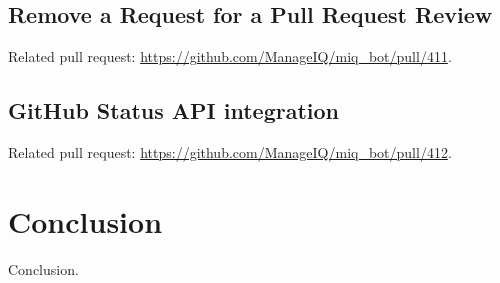 \section{Remove a Request for a Pull Request Review}

Related pull request: \url{https://github.com/ManageIQ/miq_bot/pull/411}.

\section{GitHub Status API integration}

Related pull request: \url{https://github.com/ManageIQ/miq_bot/pull/412}.

\chapter{Conclusion}

Conclusion.
